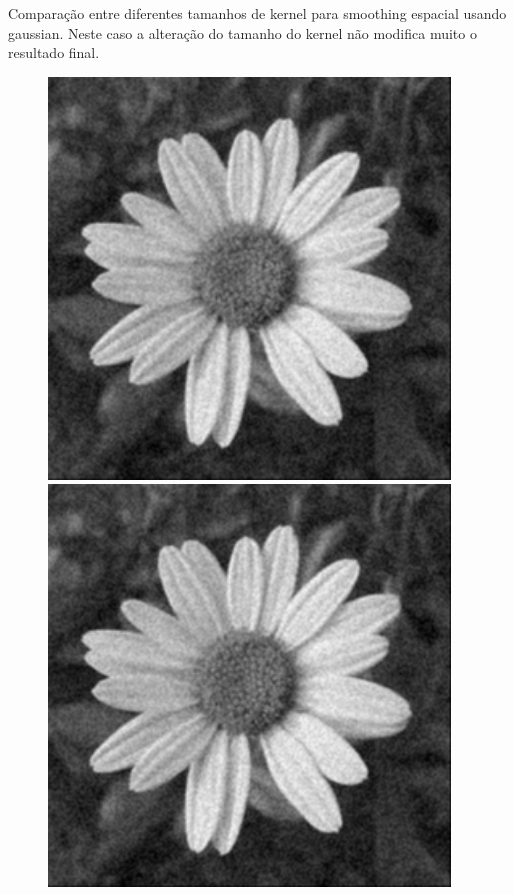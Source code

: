 \documentclass[a4paper]{report}
\begin{document}
Comparação entre diferentes tamanhos de kernel para smoothing espacial usando gaussian. Neste caso a alteração do
tamanho do kernel não modifica muito o resultado final.
\begin{figure}[H]
\centering
\begin{minipage}{.3\textwidth}
  \centering
    \includegraphics[width=0.95\textwidth]{images/Smooth/spatial-gaussian/flower_smooth_spatial_gaussian_5_2.png}
\end{minipage}%
\begin{minipage}{.3\textwidth}
  \centering
    \includegraphics[width=0.95\textwidth]{images/Smooth/spatial-gaussian/flower_smooth_spatial_gaussian_10_2.png}

\end{minipage}
\end{figure}
\end{document}
